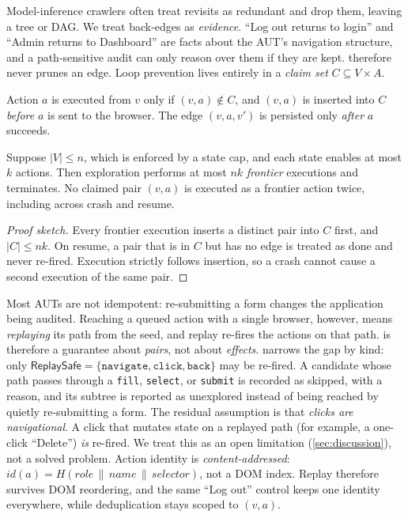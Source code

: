 Model-inference crawlers often treat revisits as redundant and drop them,
leaving a tree or DAG. We treat back-edges as \emph{evidence}. ``Log out
returns to login'' and ``Admin returns to Dashboard'' are facts about the
AUT's navigation structure, and a path-sensitive audit can only reason over
them if they are kept. \sys{} therefore never prunes an edge. Loop prevention
lives entirely in a \emph{claim set} $C\subseteq V\times A$.

\begin{definition}
Action $a$ is executed from $v$ only if $(v,a)\notin C$, and $(v,a)$ is inserted
into $C$ \emph{before} $a$ is sent to the browser. The edge $(v,a,v')$ is
persisted only \emph{after} $a$ succeeds.
\end{definition}

\begin{proposition}
\label{prop:term}
Suppose $|V|\le n$, which is enforced by a state cap, and each state enables
at most $k$ actions. Then exploration performs at most $nk$ \emph{frontier}
executions and terminates. No claimed pair $(v,a)$ is executed as a frontier
action twice, including across crash and resume.
\end{proposition}
\begin{proof}[Proof sketch]
Every frontier execution inserts a distinct pair into $C$ first, and
$|C|\le nk$. On resume, a pair that is in $C$ but has no edge is treated as
done and never re-fired. Execution strictly follows insertion, so a crash
cannot cause a second execution of the same pair.
\end{proof}

Most AUTs are not idempotent: re-submitting a form changes the application
being audited. Reaching a queued action with a single browser, however, means
\emph{replaying} its path from the seed, and replay re-fires the actions on
that path.  is therefore a guarantee about \emph{pairs}, not
about \emph{effects}. \sys{} narrows the gap by kind: only
$\textsf{ReplaySafe}=\{\texttt{navigate},\texttt{click},\texttt{back}\}$ may be
re-fired. A candidate whose path passes through a \texttt{fill},
\texttt{select}, or \texttt{submit} is recorded as skipped, with a reason, and
its subtree is reported as unexplored instead of being reached by quietly
re-submitting a form. The residual assumption is that \emph{clicks are
navigational}. A click that mutates state on a replayed path (for example, a
one-click ``Delete'') \emph{is} re-fired. We treat this as an open limitation
(\cref{sec:discussion}), not a solved problem. Action identity is
\emph{content-addressed}:
$\mathit{id}(a)=H(\mathit{role}\,\|\,\mathit{name}\,\|\,\mathit{selector})$, not
a DOM index. Replay therefore survives DOM reordering, and the same ``Log out''
control keeps one identity everywhere, while deduplication stays scoped to
$(v,a)$.

